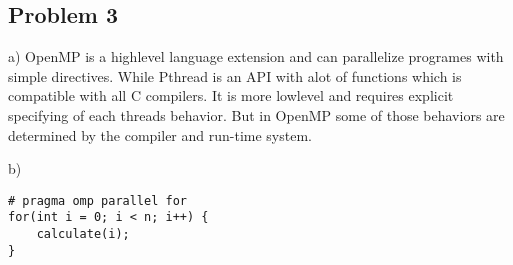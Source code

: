 \documentclass{article}
\begin{document}
\subsection{Problem 3}
\begin{flushleft}
a) OpenMP is a highlevel language extension and can parallelize programes with simple directives. While Pthread is an API with alot of functions which is compatible with all C compilers. It is more lowlevel and requires explicit specifying of each threads behavior. But in OpenMP some of those behaviors are determined by the compiler and run-time system.
\end{flushleft}
\begin{flushleft}
b) 
\begin{lstlisting}
# pragma omp parallel for 
for(int i = 0; i < n; i++) {
    calculate(i);
}
\end{lstlisting}
\end{flushleft}
\end{document}
